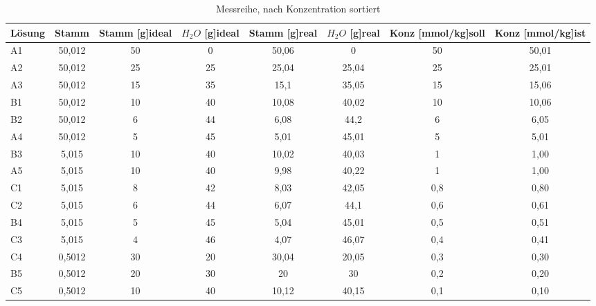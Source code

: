 
\begin{table}[H]
    \centering
    \small
    \caption{Messreihe, nach Konzentration sortiert}
    \tabcolsep=0.11cm
      \begin{tabular}{lccccccc}
      \toprule
      \textbf{Lösung} & \multicolumn{1}{l}{\textbf{Stamm}} & \multicolumn{1}{l}{\textbf{Stamm [g]ideal}} & \multicolumn{1}{l}{\textbf{$H_2O$ [g]ideal}} & \multicolumn{1}{l}{\textbf{Stamm [g]real}} & \multicolumn{1}{l}{\textbf{$H_2O$ [g]real}} & \multicolumn{1}{l}{\textbf{Konz [mmol/kg]soll}} & \multicolumn{1}{l}{\textbf{Konz [mmol/kg]ist}} \\
      \midrule
      A1    & 50,012 & 50    & 0     & 50,06 & 0     & 50    & 50,01 \\
      A2    & 50,012 & 25    & 25    & 25,04 & 25,04 & 25    & 25,01 \\
      A3    & 50,012 & 15    & 35    & 15,1  & 35,05 & 15    & 15,06 \\
      B1    & 50,012 & 10    & 40    & 10,08 & 40,02 & 10    & 10,06 \\
      B2    & 50,012 & 6     & 44    & 6,08  & 44,2  & 6     & 6,05 \\
      A4    & 50,012 & 5     & 45    & 5,01  & 45,01 & 5     & 5,01 \\
      B3    & 5,015 & 10    & 40    & 10,02 & 40,03 & 1     & 1,00 \\
      A5    & 5,015 & 10    & 40    & 9,98  & 40,22 & 1     & 1,00 \\
      C1    & 5,015 & 8     & 42    & 8,03  & 42,05 & 0,8   & 0,80 \\
      C2    & 5,015 & 6     & 44    & 6,07  & 44,1  & 0,6   & 0,61 \\
      B4    & 5,015 & 5     & 45    & 5,04  & 45,01 & 0,5   & 0,51 \\
      C3    & 5,015 & 4     & 46    & 4,07  & 46,07 & 0,4   & 0,41 \\
      C4    & 0,5012 & 30    & 20    & 30,04 & 20,05 & 0,3   & 0,30 \\
      B5    & 0,5012 & 20    & 30    & 20    & 30    & 0,2   & 0,20 \\
      C5    & 0,5012 & 10    & 40    & 10,12 & 40,15 & 0,1   & 0,10 \\
      \bottomrule
      \end{tabular}%
    \label{tab:addlabel}%
\end{table}%